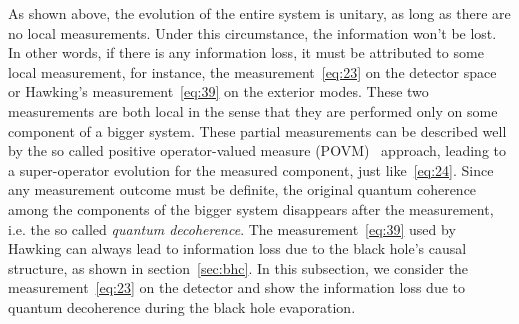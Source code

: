 \documentclass[12pt,a4paper]{article}
\begin{document}
As shown above, the evolution of the entire system is
unitary, as long as there are no local measurements. Under this
circumstance, the information won't be lost. In other words, if there is any
information loss, it must be attributed to some local
measurement, for instance, the measurement~\eqref{eq:23} on the detector space or Hawking's measurement~\eqref{eq:39} on the exterior modes. These two measurements are both local in the sense that they are performed only on some component of a bigger system.
These partial measurements can be described well by the so called
positive operator-valued measure (POVM)~\cite{i} approach, leading
to a super-operator evolution for the measured component, just like~\eqref{eq:24}. Since any measurement outcome must be definite, the
original quantum coherence among the components of the bigger
system disappears after the measurement, i.e. the so called \emph{quantum
decoherence}. The measurement~\eqref{eq:39} used by Hawking can always lead to information loss due to the black hole's causal structure, as shown in section~\ref{sec:bhc}. In this subsection, we consider the measurement~\eqref{eq:23} on the detector and show the information loss
due to quantum decoherence during the black hole evaporation.
\end{document}
